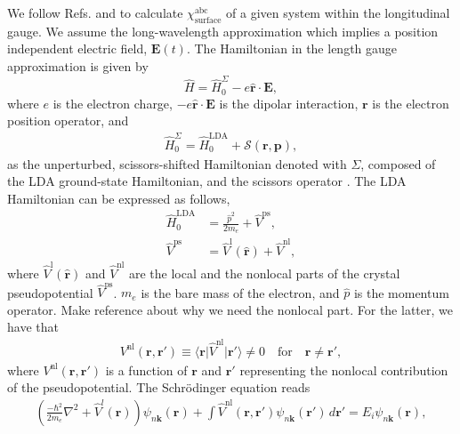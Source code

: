 We follow Refs. \cite{aversaPRB95} and \cite{cabellosPRB09} to calculate
$\chi^{\mathrm{abc}}_{\mathrm{surface}}$ of a given system within the
longitudinal gauge. We assume the long-wavelength approximation which implies a
position independent electric field, $\mathbf{E}(t)$. The Hamiltonian in the
length gauge approximation is given by
\begin{equation}\label{ache}
\hat{H}=\hat{H}^{\Sigma}_{0} - e\hat{\mathbf{r}}\cdot\mathbf{E},
\end{equation}
where $e$ is the electron charge, $-e\hat{\mathbf{r}}\cdot\mathbf{E}$ is the
dipolar interaction, $\mathbf{r}$ is the electron position operator, and
\begin{align}\label{ache.1}
  \hat{H}^{\Sigma}_{0} = \hat{H}^{\mathrm{LDA}}_{0}
+ \mathcal{S}(\mathbf{r},\mathbf{p}),
\end{align} 
as the unperturbed, scissors-shifted Hamiltonian denoted with $\Sigma$, composed
of the LDA ground-state Hamiltonian, and the scissors operator
\cite{levinePRB94}. The LDA Hamiltonian can be expressed as follows,
\begin{align}\label{ache.2}
\hat{H}^{\mathrm{LDA}}_{0}
&= \frac{\hat{p}^{2}}{2m_{e}} + \hat{V}^{\mathrm{ps}},\nonumber\\
\hat{V}^{\mathrm{ps}}
&= \hat{V}^{\mathrm{l}}(\hat{\mathbf{r}}) + \hat{V}^{\mathrm{nl}},
\end{align}  
where $\hat{V}^{\mathrm{l}}(\hat{\mathbf{r}})$ and $\hat{V}^{\mathrm{nl}}$ are
the local and the nonlocal parts of the crystal pseudopotential
$\hat{V}^{\mathrm{ps}}$. $m_{e}$ is the bare mass of the electron, and $\hat{p}$
is the momentum operator.
{\color{red} Make reference about why we need the nonlocal part.}
For the latter, we have that
\begin{align}\label{ache.3n}
V^{\mathrm{nl}}(\mathbf{r},\mathbf{r}')\equiv
\langle\mathbf{r}\vert
\hat{V}^{\mathrm{nl}}
\vert\mathbf{r}'\rangle \neq 0 
\quad\text{for}\quad\mathbf{r} \neq \mathbf{r}',
\end{align}
where $V^{\mathrm{nl}}(\mathbf{r},\mathbf{r}')$ is a function of $\mathbf{r}$
and $\mathbf{r}'$ representing the nonlocal contribution of the pseudopotential.
The Schr\"odinger equation reads
\begin{align}\label{ache.4} 
\left(
\frac{-\hbar^2}{2m_{e}}\nabla^{2}
+ \hat{V}^l(\mathbf{r})
\right)
\psi_{n\mathbf{k}}(\mathbf{r})
+ \int\hat{V}^{\mathrm{nl}}(\mathbf{r},\mathbf{r}')
  \psi_{n\mathbf{k}}(\mathbf{r}')\,d\mathbf{r}'
= E_{i}\psi_{n\mathbf{k}}(\mathbf{r}),
\end{align} 
